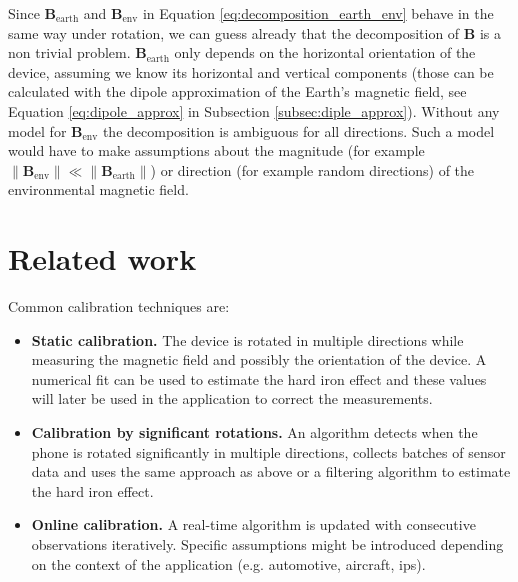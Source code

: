
Since $\bm{B}_\text{earth}$ and $\bm{B}_\text{env}$ in Equation \ref{eq:decomposition_earth_env} behave in the same way under rotation, we can guess already that the decomposition of $\bm{B}$ is a non trivial problem. $\bm{B}_\text{earth}$ only depends on the horizontal orientation of the device, assuming we know its horizontal and vertical components (those can be calculated with the dipole approximation of the Earth's magnetic field, see Equation \ref{eq:dipole_approx} in Subsection \ref{subsec:diple_approx}). Without any model for $\bm{B}_\text{env}$ the decomposition is ambiguous for all directions. Such a model would have to make assumptions about the magnitude (for example $\lVert \bm{B}_\text{env} \rVert \ll \lVert \bm{B}_\text{earth} \rVert$) or direction (for example random directions) of the environmental magnetic field.

\section{Related work}

Common calibration techniques are:

\begin{itemize}
  \item \textbf{Static calibration.} The device is rotated in multiple directions while measuring the magnetic field and possibly the orientation of the device. A numerical fit can be used to estimate the hard iron effect and these values will later be used in the application to correct the measurements.\cite{matlab_magcal}\cite{Kuncar2016}\cite{Kok2016}
  \item \textbf{Calibration by significant rotations.} An algorithm detects when the phone is rotated significantly in multiple directions, collects batches of sensor data and uses the same approach as above or a filtering algorithm to estimate the hard iron effect.\cite{Guo2008}\cite{Gebre2006}\cite{Vasconcelos2011}
  \item \textbf{Online calibration.} A real-time algorithm is updated with consecutive observations iteratively. Specific assumptions might be introduced depending on the context of the application (e.g. automotive, aircraft, \gls{ips}).\cite{Wu2018}\cite{Cao2020}
\end{itemize}
